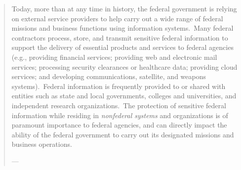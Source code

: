 \begin{formal}
\begin{quote}
Today, more than at any time in history, the federal government is relying on external service providers to help carry out a wide range of federal missions and business functions using information systems.\ Many federal contractors process, store, and transmit sensitive federal information to support the delivery of essential products and services to federal agencies (e.g., providing financial services; providing web and electronic mail services; processing security clearances or healthcare data; providing cloud services; and developing communications, satellite, and weapons systems).\ Federal information is frequently provided to or shared with entities such as state and local governments, colleges and universities, and independent research organizations.\ The protection of sensitive federal information while residing in \textit{nonfederal systems} and organizations is of paramount importance to federal agencies, and can directly impact the ability of the federal government to carry out its designated missions and business operations.

\hfill
---\cite{csfNIST800171}
\end{quote}
\end{formal}

